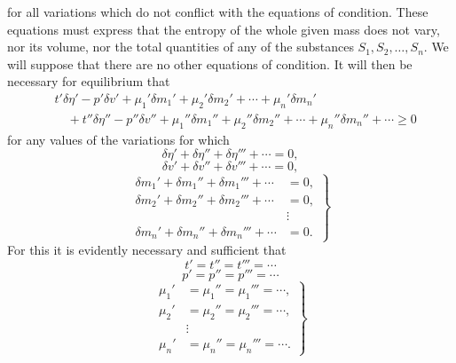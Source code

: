 \documentclass[11pt]{article}
\begin{document}
for all variations which do not conflict with the equations of condition. These equations must express that the entropy of the whole given mass does not vary, nor its volume, nor the total quantities of any of the substances \(S_1,S_2,\ldots,S_n\). We will suppose that there are no other equations of condition. It will then be necessary for equilibrium that
\begin{equation}
\begin{aligned}
&t'\delta\eta' - p'\delta v'
  + \mu_1'\delta m_1' + \mu_2'\delta m_2' + \cdots
  + \mu_n'\delta m_n' \\
&\quad
 + t''\delta\eta'' - p''\delta v''
  + \mu_1''\delta m_1'' + \mu_2''\delta m_2'' + \cdots
  + \mu_n''\delta m_n''
 + \cdots \geq 0
\end{aligned}
\end{equation}
for any values of the variations for which
\begin{equation}
\delta\eta' + \delta\eta'' + \delta\eta''' + \cdots =0,
\end{equation}
\begin{equation}
\delta v' + \delta v'' + \delta v''' + \cdots =0,
\end{equation}
\begin{equation}
\left.
\begin{aligned}
\delta m_1' + \delta m_1'' + \delta m_1''' + \cdots &=0,\\
\delta m_2' + \delta m_2'' + \delta m_2''' + \cdots &=0,\\
&\vdots\\
\delta m_n' + \delta m_n'' + \delta m_n''' + \cdots &=0.
\end{aligned}
\right\}
\end{equation}
For this it is evidently necessary and sufficient that
\begin{equation}
t'=t''=t'''=\cdots
\end{equation}
\begin{equation}
p'=p''=p'''=\cdots
\end{equation}
\begin{equation}
\left.
\begin{aligned}
\mu_1'&=\mu_1''=\mu_1'''=\cdots,\\
\mu_2'&=\mu_2''=\mu_2'''=\cdots,\\
&\vdots\\
\mu_n'&=\mu_n''=\mu_n'''=\cdots.
\end{aligned}
\right\}
\end{equation}
\end{document}
